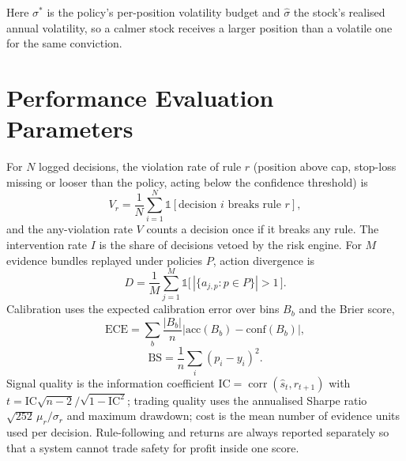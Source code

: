 Here $\sigma^\ast$ is the policy's per-position volatility budget and $\hat\sigma$ the stock's realised annual volatility, so a calmer stock receives a larger position than a volatile one for the same conviction.

\section{Performance Evaluation Parameters}
For $N$ logged decisions, the violation rate of rule $r$ (position above cap, stop-loss missing or looser than the policy, acting below the confidence threshold) is
\begin{equation}
V_r=\frac{1}{N}\sum_{i=1}^{N}\mathbb{1}[\text{decision } i \text{ breaks rule } r],
\end{equation}
and the any-violation rate $V$ counts a decision once if it breaks any rule. The intervention rate $I$ is the share of decisions vetoed by the risk engine. For $M$ evidence bundles replayed under policies $P$, action divergence is
\begin{equation}
D=\frac{1}{M}\sum_{j=1}^{M}\mathbb{1}\big[\,|\{a_{j,p}: p\in P\}|>1\,\big].
\end{equation}
Calibration uses the expected calibration error over bins $B_b$ and the Brier score,
\begin{equation}
\text{ECE}=\sum_{b}\frac{|B_b|}{n}\big|\text{acc}(B_b)-\text{conf}(B_b)\big|,
\end{equation}
\begin{equation}
\text{BS}=\frac{1}{n}\sum_{i}(p_i-y_i)^2 .
\end{equation}
Signal quality is the information coefficient $\text{IC}=\operatorname{corr}(\hat s_t, r_{t+1})$ with $t=\text{IC}\sqrt{n-2}/\sqrt{1-\text{IC}^2}$; trading quality uses the annualised Sharpe ratio $\sqrt{252}\,\mu_r/\sigma_r$ and maximum drawdown; cost is the mean number of evidence units used per decision. Rule-following and returns are always reported separately so that a system cannot trade safety for profit inside one score.

